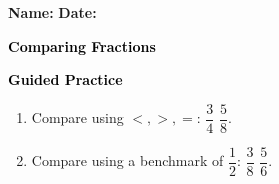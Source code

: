\documentclass[12pt, letterpaper, fleqn]{article}
\newcommand{\blank}{\underline{\hspace{2.2cm}}}
\begin{document}
\textbf{Name:} \underline{\hspace{5cm}}
\hfill
\textbf{Date:} \underline{\hspace{3cm}}\\

\begin{tcolorbox}[colback=customteal!20]
    \large\textcolor{black}{\textbf{Comparing Fractions}}
\end{tcolorbox}
\newpage
\begin{tcolorbox}[colback=customteal!20]
    \large\textcolor{black}{\textbf{Guided Practice}}
\end{tcolorbox}
\begin{enumerate}[itemsep=3.5cm, leftmargin=0.6cm]
\item Compare using $<, >, =$: $\dfrac{3}{4}$ \blank $\dfrac{5}{8}$.
\vspace{3cm}
\item Compare using a benchmark of $\dfrac{1}{2}$: $\dfrac{3}{8}$ \blank $\dfrac{5}{6}$.
\end{enumerate}
\end{document}
